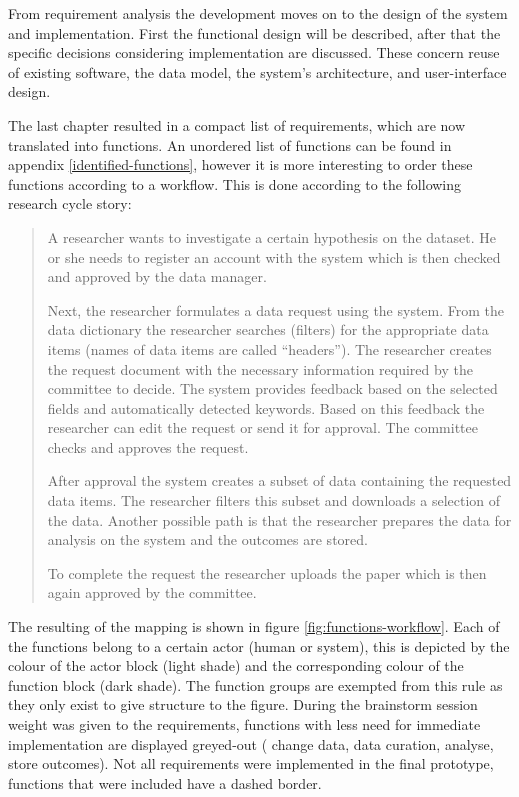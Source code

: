 From requirement analysis the development moves on to the design of the system and implementation.
First the functional design will be described, after that the specific decisions considering implementation are discussed.
These concern reuse of existing software, the data model, the system's architecture, and user-interface design.

The last chapter resulted in a compact list of requirements, which are now translated into functions.
An unordered list of functions can be found in appendix \ref{identified-functions}, however it is more interesting to order these functions according to a workflow.
This is done according to the following research cycle story:

\begin{quotation}
	\noindent{} A researcher wants to investigate a certain hypothesis on the \project{} dataset.
	He or she needs to register an account with the system which is then checked and approved by the data manager.
	
	Next, the researcher formulates a data request using the system.
	From the data dictionary the researcher searches (filters) for the appropriate data items (names of data items are called ``headers'').
	The researcher creates the request document with the necessary information required by the committee to decide.
	The system provides feedback based on the selected fields and automatically detected keywords.
	Based on this feedback the researcher can edit the request or send it for approval.
	The committee checks and approves the request.
	
	After approval the system creates a subset of \project{} data containing the requested data items.
	The researcher filters this subset and downloads a selection of the data.
	Another possible path is that the researcher prepares the data for analysis on the system and the outcomes are stored.
	
	To complete the request the researcher uploads the paper which is then again approved by the committee.
\end{quotation}

\noindent{} The resulting of the mapping is shown in figure \ref{fig:functions-workflow}.
Each of the functions belong to a certain actor (human or system), this is depicted by the colour of the actor block (light shade) and the corresponding colour of the function block (dark shade).
The function groups are exempted from this rule as they only exist to give structure to the figure.
During the brainstorm session weight was given to the requirements, functions with less need for immediate implementation are displayed greyed-out (\ie{} change data, data curation, analyse, store outcomes).
Not all requirements were implemented in the final prototype, functions that were included have a dashed border.

